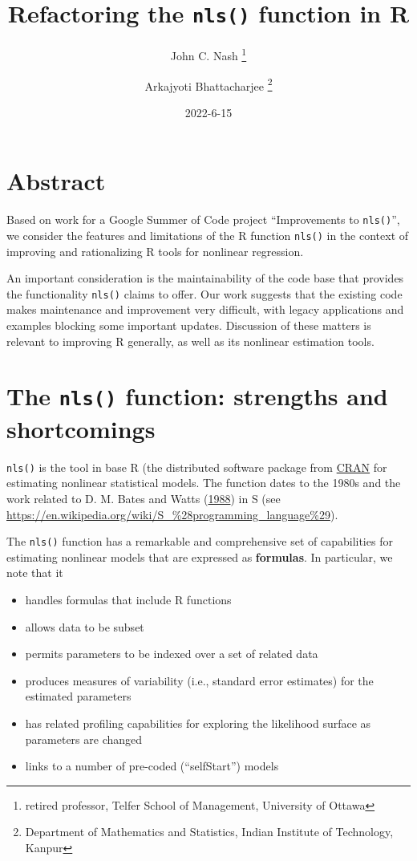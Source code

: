 \documentclass[
]{article}
\title{Refactoring the \texttt{nls()} function in R}
\author{John C. Nash
\thanks{ retired professor, Telfer School of Management, University of Ottawa} \and Arkajyoti
Bhattacharjee
\thanks{Department of Mathematics and Statistics, Indian Institute of Technology, Kanpur}}
\date{2022-6-15}
\providecommand{\tightlist}{%
  \setlength{\itemsep}{0pt}\setlength{\parskip}{0pt}}
\begin{document}
\maketitle

{
\hypersetup{linkcolor=}
\setcounter{tocdepth}{2}
\tableofcontents
}
\hypertarget{abstract}{%
\section{Abstract}\label{abstract}}

Based on work for a Google Summer of Code project ``Improvements to
\texttt{nls()}'', we consider the features and limitations of the R
function \texttt{nls()} in the context of improving and rationalizing R
tools for nonlinear regression.

An important consideration is the maintainability of the code base that
provides the functionality \texttt{nls()} claims to offer. Our work
suggests that the existing code makes maintenance and improvement very
difficult, with legacy applications and examples blocking some important
updates. Discussion of these matters is relevant to improving R
generally, as well as its nonlinear estimation tools.

\hypertarget{the-nls-function-strengths-and-shortcomings}{%
\section{\texorpdfstring{The \texttt{nls()} function: strengths and
shortcomings}{The nls() function: strengths and shortcomings}}\label{the-nls-function-strengths-and-shortcomings}}

\texttt{nls()} is the tool in base R (the distributed software package
from \href{https://cran.r-project.org}{CRAN} for estimating nonlinear
statistical models. The function dates to the 1980s and the work related
to D. M. Bates and Watts (\protect\hyperlink{ref-bateswatts}{1988}) in S
(see
\url{https://en.wikipedia.org/wiki/S_\%28programming_language\%29}).

The \texttt{nls()} function has a remarkable and comprehensive set of
capabilities for estimating nonlinear models that are expressed as
\textbf{formulas}. In particular, we note that it

\begin{itemize}
\tightlist
\item
  handles formulas that include R functions
\item
  allows data to be subset
\item
  permits parameters to be indexed over a set of related data
\item
  produces measures of variability (i.e., standard error estimates) for
  the estimated parameters
\item
  has related profiling capabilities for exploring the likelihood
  surface as parameters are changed
\item
  links to a number of pre-coded (``selfStart'') models
\end{itemize}
\end{document}
